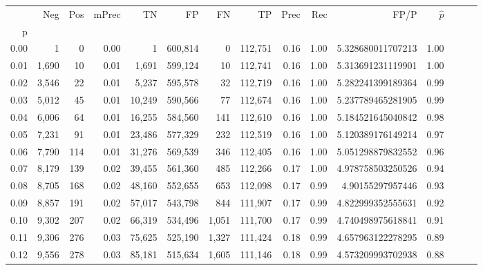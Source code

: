\begin{tabular}{rrrrrrrrrrrrrrr}
\toprule
{} &    Neg &    Pos & mPrec &       TN &       FP &       FN &       TP &  Prec &   Rec &                    FP/P & $\hat{p}$ \\
p    &        &        &       &          &          &          &          &       &       &                         &           \\
\midrule
0.00 &      1 &      0 &  0.00 &        1 &  600,814 &        0 &  112,751 &  0.16 &  1.00 &       5.328680011707213 &      1.00 \\
0.01 &  1,690 &     10 &  0.01 &    1,691 &  599,124 &       10 &  112,741 &  0.16 &  1.00 &       5.313691231119901 &      1.00 \\
0.02 &  3,546 &     22 &  0.01 &    5,237 &  595,578 &       32 &  112,719 &  0.16 &  1.00 &       5.282241399189364 &      0.99 \\
0.03 &  5,012 &     45 &  0.01 &   10,249 &  590,566 &       77 &  112,674 &  0.16 &  1.00 &       5.237789465281905 &      0.99 \\
0.04 &  6,006 &     64 &  0.01 &   16,255 &  584,560 &      141 &  112,610 &  0.16 &  1.00 &       5.184521645040842 &      0.98 \\
0.05 &  7,231 &     91 &  0.01 &   23,486 &  577,329 &      232 &  112,519 &  0.16 &  1.00 &       5.120389176149214 &      0.97 \\
0.06 &  7,790 &    114 &  0.01 &   31,276 &  569,539 &      346 &  112,405 &  0.16 &  1.00 &       5.051298879832552 &      0.96 \\
0.07 &  8,179 &    139 &  0.02 &   39,455 &  561,360 &      485 &  112,266 &  0.17 &  1.00 &       4.978758503250526 &      0.94 \\
0.08 &  8,705 &    168 &  0.02 &   48,160 &  552,655 &      653 &  112,098 &  0.17 &  0.99 &        4.90155297957446 &      0.93 \\
0.09 &  8,857 &    191 &  0.02 &   57,017 &  543,798 &      844 &  111,907 &  0.17 &  0.99 &       4.822999352555631 &      0.92 \\
0.10 &  9,302 &    207 &  0.02 &   66,319 &  534,496 &    1,051 &  111,700 &  0.17 &  0.99 &       4.740498975618841 &      0.91 \\
0.11 &  9,306 &    276 &  0.03 &   75,625 &  525,190 &    1,327 &  111,424 &  0.18 &  0.99 &       4.657963122278295 &      0.89 \\
0.12 &  9,556 &    278 &  0.03 &   85,181 &  515,634 &    1,605 &  111,146 &  0.18 &  0.99 &       4.573209993702938 &      0.88 \\

\end{tabular}
